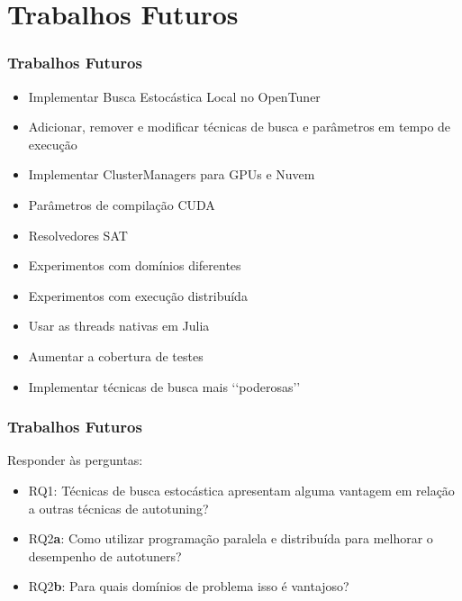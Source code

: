 \documentclass[10pt, compress]{beamer}
\begin{document}
\section{Trabalhos Futuros}

\begin{frame}[fragile]
    \frametitle{Trabalhos Futuros}
    \begin{itemize}
        \item Implementar Busca Estocástica Local no \alert{OpenTuner}
            \pause
        \item \alert{Adicionar}, \alert{remover} e \alert{modificar} técnicas
            de busca e parâmetros em \alert{tempo de execução}
            \pause
        \item Implementar \alert{ClusterManagers} para \alert{GPUs} e \alert{Nuvem}
            \pause
        \item Parâmetros de compilação \alert{CUDA}
        \item Resolvedores \alert{SAT}
            \pause
        \item Experimentos com \alert{domínios diferentes}
        \item Experimentos com \alert{execução distribuída}
        \item Usar as \alert{threads nativas} em Julia
            \pause
        \item \alert{Aumentar} a cobertura de testes
            \pause
        \item Implementar técnicas de busca mais \lq{}\lq{}\alert{poderosas}\rq{}\rq{}
    \end{itemize}
\end{frame}

\begin{frame}[fragile]
    \frametitle{Trabalhos Futuros}
    Responder às perguntas:
    \begin{itemize}
        \item \alert{RQ1}: Técnicas de busca estocástica apresentam
            alguma vantagem em relação a outras técnicas de autotuning?
            \pause
        \item \alert{RQ2\textbf{a}}: Como utilizar programação paralela e
            distribuída para melhorar o desempenho de autotuners?
            \pause
        \item \alert{RQ2\textbf{b}}: Para quais domínios de problema isso é
            vantajoso?
    \end{itemize}
\end{frame}


\maketitle
\end{document}
